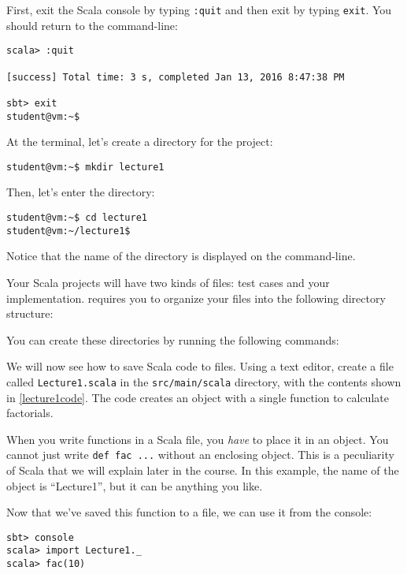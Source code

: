 \documentclass[9pt]{extbook}
\begin{document}
First, exit the Scala console by typing \verb|:quit| and then exit \sbt{}
by typing \verb|exit|. You should return to the command-line:
%
\begin{lstlisting}
scala> :quit

[success] Total time: 3 s, completed Jan 13, 2016 8:47:38 PM

sbt> exit
student@vm:~$
\end{lstlisting}

At the terminal, let's create a directory for the project:
%
\begin{lstlisting}
student@vm:~$ mkdir lecture1
\end{lstlisting}
%
Then, let's enter the directory:
\begin{lstlisting}
student@vm:~$ cd lecture1
student@vm:~/lecture1$
\end{lstlisting}
Notice that the name of the directory is displayed on the command-line.

Your Scala projects will have two kinds of files: test cases and your implementation.
\sbt{} requires you to organize your files into the following directory
structure:

\begin{minipage}{0.5\textwidth}
\end{minipage}

You can create these directories by running the following commands:

We will now see how to save Scala code to files. Using a text editor,
create a file called \verb|Lecture1.scala| in the
\verb|src/main/scala| directory, with the contents shown in \cref{lecture1code}.
The code creates an object with a single function to calculate factorials.

When you write functions in a Scala file, you \emph{have} to place it in
an object. You cannot just write \lstinline|def fac ...| without an enclosing
object. This is a peculiarity of Scala that we will explain later in the course.
In this example, the name of the object is ``Lecture1'', but it can be anything
you like.

\lstset{language=console}
Now that we've saved this function to a file, we can use it from the console:
%
\begin{lstlisting}
sbt> console
scala> import Lecture1._
scala> fac(10)
\end{lstlisting}
\end{document}
